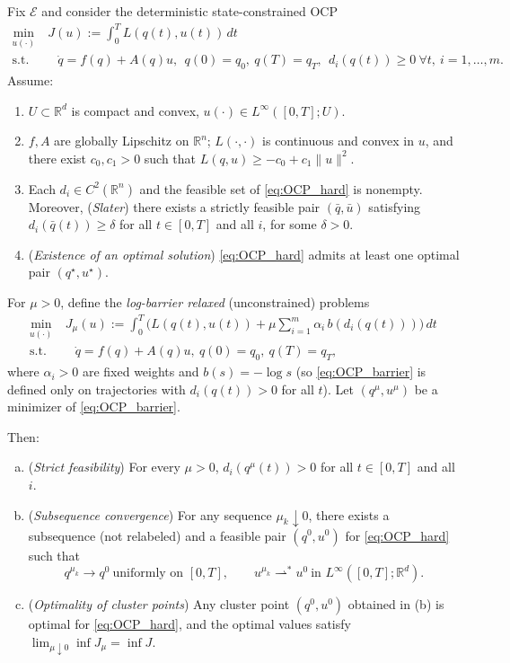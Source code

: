 \begin{proposition}
\label{prop:barrier_to_state_constrained_complete}
Fix $\mathcal E$ and consider the deterministic state-constrained OCP
\begin{equation}
\begin{aligned}
\label{eq:OCP_hard}
\min_{u(\cdot)}&\ J(u):=\int_0^T L(q(t),u(t))\,dt\\
 \text{s.t.}&\quad 
\dot q=f(q)+A(q)u,\ \ q(0)=q_0,\ q(T)=q_T,\ \ d_i(q(t))\ge 0\ \forall t,\ i=1,\dots,m .
\end{aligned}
\end{equation}
Assume:
\begin{enumerate}[(H1)]
\item $U\subset\mathbb R^d$ is compact and convex, $u(\cdot)\in L^\infty([0,T];U)$.
\item $f,A$ are globally Lipschitz on $\mathbb R^n$; $L(\cdot,\cdot)$ is continuous and convex in $u$,
and there exist $c_0,c_1>0$ such that $L(q,u)\ge -c_0+c_1\|u\|^2$.
\item Each $d_i\in C^2(\mathbb R^n)$ and the feasible set of \cref{eq:OCP_hard} is nonempty.
Moreover, (\emph{Slater}) there exists a strictly feasible pair $(\bar q,\bar u)$ satisfying $d_i(\bar q(t))\ge \delta$
for all $t\in[0,T]$ and all $i$, for some $\delta>0$.
\item (\emph{Existence of an optimal solution}) \cref{eq:OCP_hard} admits at least one optimal pair $(q^\star,u^\star)$.
\end{enumerate}
For $\mu>0$, define the \emph{log-barrier relaxed} (unconstrained) problems
\begin{equation}
\begin{aligned}
\label{eq:OCP_barrier}
\min_{u(\cdot)}&\ J_\mu(u)
:=\int_0^T \Big( L(q(t),u(t)) + \mu\sum_{i=1}^m \alpha_i\,b(d_i(q(t)))\Big)\,dt \\
\text{s.t.}&\quad
\dot q=f(q)+A(q)u,\ q(0)=q_0,\ q(T)=q_T,
\end{aligned}
\end{equation}
where $\alpha_i>0$ are fixed weights and $b(s)=-\log s$ (so \cref{eq:OCP_barrier} is defined only on trajectories with
$d_i(q(t))>0$ for all $t$). Let $(q^\mu,u^\mu)$ be a minimizer of \cref{eq:OCP_barrier}.

Then:
\begin{enumerate}[(a)]
\item (\emph{Strict feasibility}) For every $\mu>0$, $d_i(q^\mu(t))>0$ for all $t\in[0,T]$ and all $i$.
\item (\emph{Subsequence convergence}) For any sequence $\mu_k\downarrow 0$, there exists a subsequence (not relabeled) and
a feasible pair $(q^0,u^0)$ for \cref{eq:OCP_hard} such that
\[
q^{\mu_k}\to q^0 \ \text{uniformly on }[0,T],
\qquad
u^{\mu_k}\rightharpoonup^\ast u^0 \ \text{in }L^\infty([0,T];\mathbb R^d).
\]
\item (\emph{Optimality of cluster points}) Any cluster point $(q^0,u^0)$ obtained in (b) is optimal for \cref{eq:OCP_hard}, and
the optimal values satisfy $\lim_{\mu\downarrow 0}\inf J_\mu = \inf J$.
\end{enumerate}


\end{proposition}
